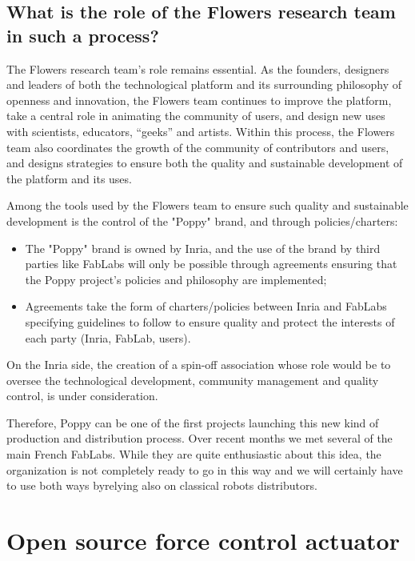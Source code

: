\subsection{What is the role of the Flowers research team in such a process? } %

The Flowers research team's role remains essential. As the founders, designers and leaders of both the technological platform and its surrounding philosophy of openness and innovation, the Flowers team continues to improve the platform, take a central role in animating the community of users, and design new uses with scientists, educators, “geeks” and artists. Within this process, the Flowers team also coordinates the growth of the community of contributors and users, and designs strategies to ensure both the quality and sustainable development of the platform and its uses.

Among the tools used by the Flowers team to ensure such quality and sustainable development is the control of the "Poppy" brand, and through policies/charters:

\begin{itemize}
\item The "Poppy" brand is owned by Inria, and the use of the brand by third parties like FabLabs will only be possible through agreements ensuring that the Poppy project’s policies and philosophy are implemented;
\item Agreements take the form of charters/policies between Inria and FabLabs specifying guidelines to follow to ensure quality and protect the interests of each party (Inria, FabLab, users).
\end{itemize}

On the Inria side, the creation of a spin-off association whose role would be to  oversee the technological development, community management and quality control, is under consideration.



Therefore, Poppy can be one of the first projects launching this new kind of production and distribution process. Over recent months we met several of the main French FabLabs. While they are quite enthusiastic about this idea, the organization is not completely ready to go in this way and we will certainly have to use both ways byrelying also on classical robots distributors.





\section{Open source force control actuator} %
\label{sec:open_sourcing_the_robotic_actuations}

